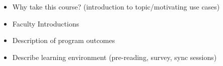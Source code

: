 \documentclass[12pt]{article}
\renewcommand{\_}{\kern-1.5pt\textunderscore\kern-1.5pt}
\begin{document}
\begin{itemize}
	\item Why take this course? (introduction to topic/motivating use cases) %

	\item Faculty Introductions %

	\item Description of program outcomes %

	\item Describe learning environment (pre-reading, survey, sync sessions) %
\end{itemize}\par


\newpage

\end{document}
